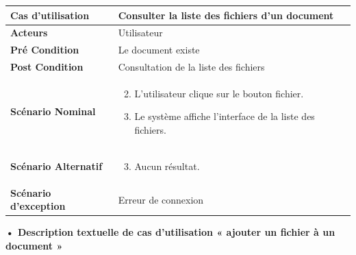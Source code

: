 \begin{longtable}{|p{5cm}|p{10cm}|}
\hline
\textbf{Cas d'utilisation}&Consulter la liste des fichiers d'un document\\
\hline
\textbf{Acteurs}&Utilisateur\\
\hline
\textbf{Pré Condition}&Le document existe\\
\hline
\textbf{Post Condition}&Consultation de la liste des fichiers\\
\hline
\textbf{Scénario Nominal}&
\vspace{-\baselineskip}
\begin{enumerate}
    \setcounter{enumi}{1}
    \item L'utilisateur clique sur le bouton fichier.
    \item Le système affiche l'interface de la liste des fichiers.
    
\end{enumerate}\\
\hline
\textbf{Scénario Alternatif}&
\vspace{-\baselineskip}
\begin{enumerate}
    \setcounter{enumi}{2}
    \item Aucun résultat.
\end{enumerate}\\
\hline
\textbf{Scénario d'exception}&Erreur de connexion\\
\hline
\end{longtable}

\textbf{•	Description textuelle de cas d'utilisation « ajouter un fichier à un document »}

